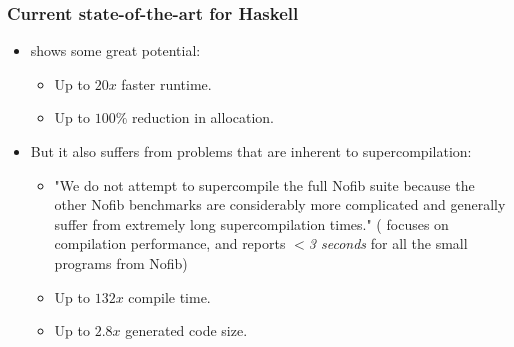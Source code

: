 \documentclass{beamer}
\begin{document}
\begin{frame}
    \frametitle{Current state-of-the-art for Haskell}

    \begin{itemize}
        \item
            \citet{callbyneed-sc} shows some great potential:
            \begin{itemize}
                \item
                    Up to $20x$ faster runtime.
                \item
                    Up to $100\%$ reduction in allocation.
            \end{itemize}
        \item
            But it also suffers from problems that are inherent to
            supercompilation:
            \begin{itemize}
                \item
                    "We do not attempt to supercompile the full Nofib suite because the
                    other Nofib benchmarks are considerably more complicated and
                    generally suffer from extremely long supercompilation times."
                    \newline
                    (\citet{timeandspace} focuses on compilation performance,
                    and reports \textit{$<$3 seconds} for all the small programs
                    from Nofib)
                \item
                    Up to $132x$ compile time.
                \item
                    Up to $2.8x$ generated code size.
            \end{itemize}
    \end{itemize}
\end{frame}
\end{document}
